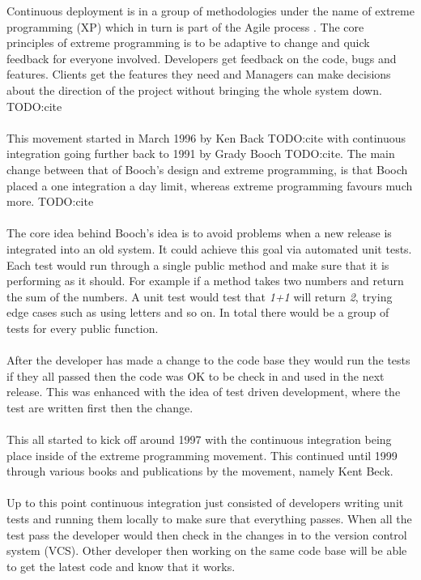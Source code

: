 Continuous deployment is in a group of methodologies under the name of extreme programming (XP) which in turn is part of the Agile process \cite{XP}. The core principles of extreme programming is to be adaptive to change and quick feedback for everyone involved. Developers get feedback on the code, bugs and features. Clients get the features they need and Managers can make decisions about the direction of the project without bringing the whole system down. TODO:cite
\\\\
This movement started in March 1996 by Ken Back TODO:cite with continuous integration going further back to 1991 by Grady Booch TODO:cite. The main change between that of Booch's design and extreme programming, is that Booch placed a one integration a day limit, whereas extreme programming favours much more. TODO:cite
\\\\
The core idea behind Booch's idea is to avoid problems when a new release is integrated into an old system. It could achieve this goal via automated unit tests. Each test would run through a single public method and make sure that it is performing as it should. For example if a method takes two numbers and return the sum of the numbers. A unit test would test that \textit{1+1} will return \textit{2}, trying edge cases such as using letters and so on. In total there would be a group of tests for every public function. 
\\\\
After the developer has made a change to the code base they would run the tests if they all passed then the code was OK to be check in and used in the next release. This was enhanced with the idea of test driven development, where the test are written first then the change.
\\\\
This all started to kick off around 1997 with the continuous integration being place inside of the extreme programming movement.  This continued until 1999 through various books and publications by the movement, namely Kent Beck.
\\\\
Up to this point continuous integration just consisted of developers writing unit tests and running them locally to make sure that everything passes. When all the test pass the developer would then   check in the changes in to the version control system (VCS). Other developer then working on the same code base will be able to get the latest code and know that it works.

